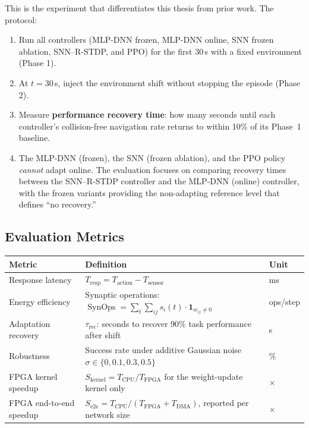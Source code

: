 \documentclass[11pt,a4paper]{article}
\DeclareMathOperator{\SynOps}{SynOps}
\begin{document}
This is the experiment that differentiates this thesis from prior work. The protocol:

\begin{enumerate}[leftmargin=*, itemsep=3pt]
  \item Run all controllers (MLP-DNN frozen, MLP-DNN online, SNN frozen
        ablation, SNN--R-STDP, and PPO) for the first 30\,s with a fixed
        environment (Phase 1).
  \item At $t = 30$\,s, inject the environment shift without stopping the episode
        (Phase 2).
  \item Measure \textbf{performance recovery time}: how many seconds until each
        controller's collision-free navigation rate returns to within 10\% of its
        Phase~1 baseline.
  \item The MLP-DNN (frozen), the SNN (frozen ablation), and the PPO policy
        \emph{cannot} adapt online. The evaluation focuses on comparing recovery
        times between the SNN--R-STDP controller and the MLP-DNN (online)
        controller, with the frozen variants providing the non-adapting reference
        level that defines ``no recovery.''
\end{enumerate}

\subsection{Evaluation Metrics}
\label{sec:metrics}

\begin{center}
\renewcommand{\arraystretch}{1.3}
\begin{tabular}{@{}p{3.2cm}p{8.2cm}p{1.6cm}@{}}
  \toprule
  \textbf{Metric} & \textbf{Definition} & \textbf{Unit} \\
  \midrule
  Response latency & $T_{\mathrm{resp}} = T_{\mathrm{action}} - T_{\mathrm{sensor}}$ & ms \\
  Energy efficiency & Synaptic operations: $\SynOps = \sum_t \sum_{ij} s_i(t)\cdot\mathbf{1}_{w_{ij}\neq 0}$ & ops/step \\
  Adaptation recovery & $\tau_{\mathrm{rec}}$: seconds to recover 90\% task performance after shift & s \\
  Robustness & Success rate under additive Gaussian noise $\sigma \in \{0, 0.1, 0.3, 0.5\}$ & \% \\
  FPGA kernel speedup & $S_{\mathrm{kernel}} = T_{\mathrm{CPU}} / T_{\mathrm{FPGA}}$ for the weight-update kernel only & $\times$ \\
  FPGA end-to-end speedup & $S_{\mathrm{e2e}} = T_{\mathrm{CPU}} / (T_{\mathrm{FPGA}} + T_{\mathrm{DMA}})$, reported per network size & $\times$ \\
  \bottomrule
\end{tabular}
\end{center}
\end{document}
